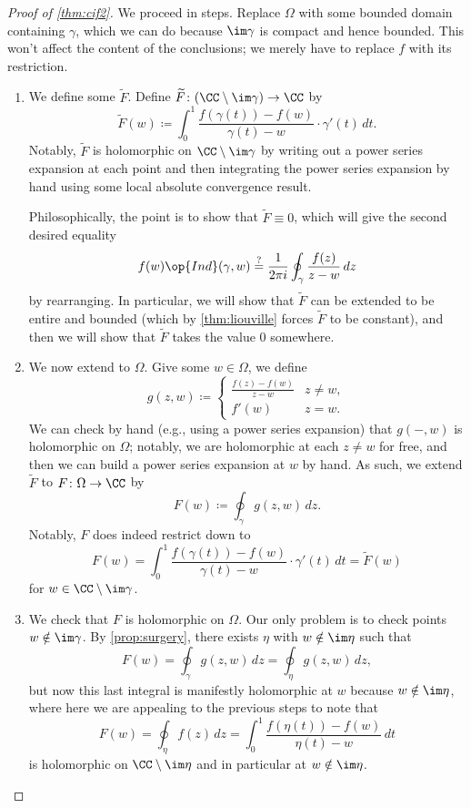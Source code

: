 \documentclass[../notes.tex]{subfiles}
\begin{document}
\begin{proof}[Proof of \autoref{thm:cif2}]
	We proceed in steps. Replace $\Omega$ with some bounded domain containing $\gamma$, which we can do because $\im\gamma$ is compact and hence bounded. This won't affect the content of the conclusions; we merely have to replace $f$ with its restriction.
	\begin{enumerate}
		\item We define some $\widetilde F$. Define $\widetilde F\colon (\CC\setminus\im\gamma)\to\CC$ by
		\[\widetilde F(w)\coloneqq \int_0^1\frac{f(\gamma(t))-f(w)}{\gamma(t)-w}\cdot\gamma'(t)\,dt.\]
		Notably, $\widetilde F$ is holomorphic on $\CC\setminus\im\gamma$ by writing out a power series expansion at each point and then integrating the power series expansion by hand using some local absolute convergence result.

		Philosophically, the point is to show that $\widetilde F\equiv0$, which will give the second desired equality
		\[f(w)\op{Ind}(\gamma,w)\stackrel?=\frac1{2\pi i}\oint_\gamma\frac{f(z)}{z-w}\,dz\]
		by rearranging. In particular, we will show that $\widetilde F$ can be extended to be entire and bounded (which by \autoref{thm:liouville} forces $\widetilde F$ to be constant), and then we will show that $\widetilde F$ takes the value $0$ somewhere.

		\item We now extend to $\Omega$. Give some $w\in\Omega$, we define
		\[g(z,w)\coloneqq \begin{cases}
			\frac{f(z)-f(w)}{z-w} & z\ne w, \\
			f'(w) & z=w.
		\end{cases}\]
		We can check by hand (e.g., using a power series expansion) that $g(-,w)$ is holomorphic on $\Omega$; notably, we are holomorphic at each $z\ne w$ for free, and then we can build a power series expansion at $w$ by hand. As such, we extend $\widetilde F$ to $F\colon \Omega\to\CC$ by
		\[F(w)\coloneqq \oint_\gamma g(z,w)\,dz.\]
		Notably, $F$ does indeed restrict down to
		\[F(w)=\int_0^1\frac{f(\gamma(t))-f(w)}{\gamma(t)-w}\cdot\gamma'(t)\,dt=\widetilde F(w)\]
		for $w\in\CC\setminus\im\gamma$.

		\item We check that $F$ is holomorphic on $\Omega$. Our only problem is to check points $w\notin\im\gamma$. By \autoref{prop:surgery}, there exists $\eta$ with $w\notin\im\eta$ such that
		\[F(w)=\oint_\gamma g(z,w)\,dz=\oint_\eta g(z,w)\,dz,\]
		but now this last integral is manifestly holomorphic at $w$ because $w\notin\im\eta$, where here we are appealing to the previous steps to note that
		\[F(w)=\oint_\eta f(z)\,dz=\int_0^1\frac{f(\eta(t))-f(w)}{\eta(t)-w}\,dt\]
		is holomorphic on $\CC\setminus\im\eta$ and in particular at $w\notin\im\eta$.


\end{enumerate}
\end{proof}
\end{document}
